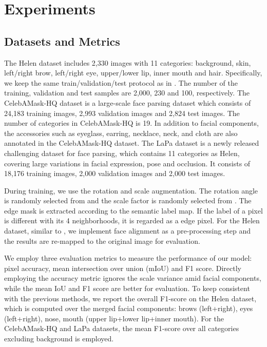 \documentclass[runningheads]{llncs}
\begin{document}
\section{Experiments}


\subsection{Datasets and Metrics}

The Helen dataset includes 2,330 images with 11 categories: background, skin, left/right brow, left/right eye, upper/lower lip, inner mouth and hair. Specifically, we keep the same train/validation/test protocol as in \cite{le2012interactive}. The number of the training, validation and test samples are 2,000, 230 and 100, respectively.
The CelebAMask-HQ dataset is a large-scale face parsing dataset which consists of 24,183 training images, 2,993 validation images and 2,824 test images.
The number of categories in CelebAMask-HQ is 19. In addition to facial components, the accessories such as eyeglass, earring, necklace, neck, and cloth are also annotated in the CelebAMask-HQ dataset.
The LaPa dataset is a newly released challenging dataset for face parsing, which contains 11 categories as Helen, covering large variations in facial expression, pose and occlusion. It consists of 18,176 training images, 2,000 validation images and 2,000 test images.

During training, we use the rotation and scale augmentation. The rotation angle is randomly selected from  and the scale factor is randomly selected from .
The edge mask is extracted according to the semantic label map. If the label of a pixel is different with its 4 neighborhoods, it is regarded as a edge pixel.
For the Helen dataset, similar to \cite{lin2019face}, we implement face alignment as a pre-processing step and the results are re-mapped to the original image for evaluation.

We employ three evaluation metrics to measure the performance of our model: pixel accuracy, mean intersection over union (mIoU) and F1 score.
Directly employing the accuracy metric ignores the scale variance amid facial components, while the mean IoU and F1 score are better for evaluation. 
To keep consistent with the previous methods, we report the overall F1-score on the Helen dataset, which is computed over the merged facial components: brows (left+right), eyes (left+right), nose, mouth (upper lip+lower lip+inner mouth). For the CelebAMask-HQ and LaPa datasets, the mean F1-score over all categories excluding background is employed.
\end{document}
